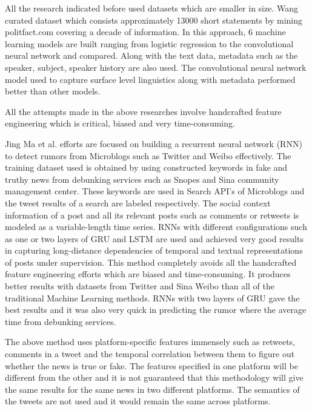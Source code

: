 \documentclass[a4paper, 11pt]{article}
\begin{document}
All the research indicated before used datasets which are smaller in size. Wang \cite{Wang2017} curated dataset which consists approximately 13000 short statements by mining politfact.com covering a decade of information. In this approach, 6 machine learning models are built ranging from logistic regression to the convolutional neural network and compared. Along with the text data, metadata such as the speaker, subject, speaker history are also used. The convolutional neural network model used to capture surface level linguistics along with metadata performed better than other models.

All the attempts made in the above researches involve handcrafted feature engineering which is critical, biased and very time-consuming.

Jing Ma et al.\cite{Ma} efforts are focused on building a recurrent neural network (RNN) to detect rumors from Microblogs such as Twitter and Weibo effectively. The training dataset used is obtained by using constructed keywords in fake and truthy news from debunking services such as Snopes and Sina community management center. These keywords are used in Search API's of Microblogs and the tweet results of a search are labeled respectively. The social context information of a post and all its relevant posts such as comments or retweets is modeled as a variable-length time series. RNNs with different configurations such as one or two layers of GRU and LSTM are used and achieved very good results in capturing long-distance dependencies of temporal and textual representations of posts under supervision. This method completely avoids all the handcrafted feature engineering efforts which are biased and time-consuming. It produces better results with datasets from Twitter and Sina Weibo than all of the traditional Machine Learning methods. RNNs with two layers of GRU gave the best results and it was also very quick in predicting the rumor where the average time from debunking services.

The above method uses platform-specific features immensely such as retweets, comments in a tweet and the temporal correlation between them to figure out whether the news is true or fake. The features specified in one platform will be different from the other and it is not guaranteed that this methodology will give the same results for the same news in two different platforms. The semantics of the tweets are not used and it would remain the same across platforms. 
\end{document}
